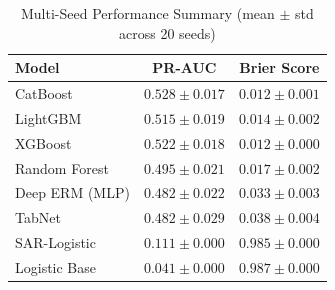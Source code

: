 \begin{table}[H]
\centering
\caption{Multi-Seed Performance Summary (mean $\pm$ std across 20 seeds)}
\label{tab:seed_summary}
\begin{tabular}{lcc}
\toprule
\textbf{Model} & \textbf{PR-AUC} & \textbf{Brier Score} \\
\midrule
CatBoost & $0.528 \pm 0.017$ & $0.012 \pm 0.001$ \\
LightGBM & $0.515 \pm 0.019$ & $0.014 \pm 0.002$ \\
XGBoost & $0.522 \pm 0.018$ & $0.012 \pm 0.000$ \\
Random Forest & $0.495 \pm 0.021$ & $0.017 \pm 0.002$ \\
Deep ERM (MLP) & $0.482 \pm 0.022$ & $0.033 \pm 0.003$ \\
TabNet & $0.482 \pm 0.029$ & $0.038 \pm 0.004$ \\
SAR-Logistic & $0.111 \pm 0.000$ & $0.985 \pm 0.000$ \\
Logistic Base & $0.041 \pm 0.000$ & $0.987 \pm 0.000$ \\
\bottomrule
\end{tabular}
\end{table}
